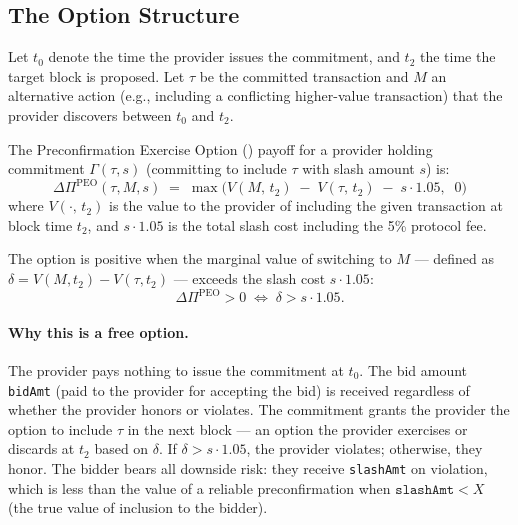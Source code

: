 \subsection{The Option Structure}
\label{sec:peo-option}

Let $t_0$ denote the time the provider issues the commitment, and $t_2$ the
time the target block is proposed. Let $\tau$ be the committed transaction
and $M$ an alternative action (e.g., including a conflicting higher-value
transaction) that the provider discovers between $t_0$ and $t_2$.

\begin{definition}
\label{def:peo}
The Preconfirmation Exercise Option (\PEO{}) payoff for a provider holding
commitment $\Gamma(\tau, s)$ (committing to include $\tau$ with slash
amount $s$) is:
\[
  \Delta\Pi^{\mathrm{PEO}}(\tau, M, s) \;=\;
  \max\!\Big(
    V(M,\, t_2) \;-\; V(\tau,\, t_2) \;-\; s \cdot 1.05,\;\; 0
  \Big)
\]
where $V(\cdot,\, t_2)$ is the value to the provider of including the
given transaction at block time $t_2$, and $s \cdot 1.05$ is the total
slash cost including the 5\% protocol fee.
\end{definition}

\noindent The option is positive when the marginal value of switching
to $M$ --- defined as $\delta = V(M, t_2) - V(\tau, t_2)$ --- exceeds the
slash cost $s \cdot 1.05$:
\[
  \Delta\Pi^{\mathrm{PEO}} > 0 \;\iff\; \delta > s \cdot 1.05.
\]

\paragraph{Why this is a free option.}
The provider pays nothing to issue the commitment at $t_0$. The bid
amount \texttt{bidAmt} (paid to the provider for accepting the bid) is
received regardless of whether the provider honors or violates.
The commitment grants the provider the option to include $\tau$ in the
next block --- an option the provider exercises or discards at $t_2$ based
on $\delta$. If $\delta > s \cdot 1.05$, the provider violates; otherwise,
they honor. The bidder bears all downside risk: they receive \texttt{slashAmt}
on violation, which is less than the value of a reliable preconfirmation
when $\texttt{slashAmt} < X$ (the true value of inclusion to the bidder).


